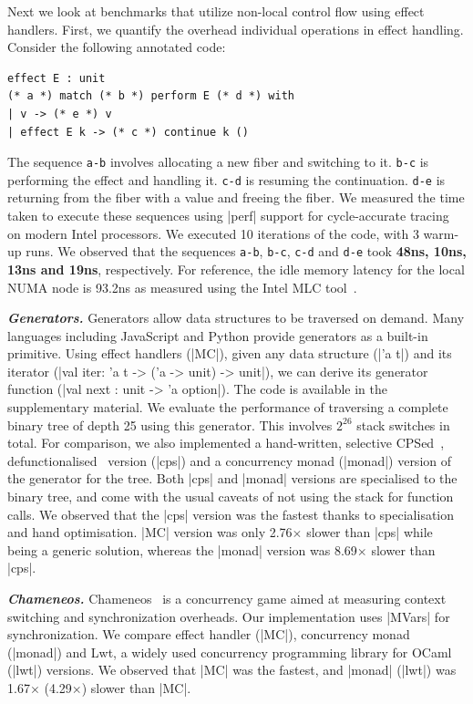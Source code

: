 \documentclass[sigplan,10pt,review,anonymous]{acmart}\settopmatter{printfolios=true,printccs=false,printacmref=false}
\begin{document}
Next we look at benchmarks that utilize non-local control flow using effect
handlers. First, we quantify the overhead individual operations in effect
handling. Consider the following annotated code:
\begin{lstlisting}
effect E : unit
(* a *) match (* b *) perform E (* d *) with
| v -> (* e *) v
| effect E k -> (* c *) continue k ()
\end{lstlisting}
The sequence \texttt{a-b} involves allocating a new fiber and switching to it.
\texttt{b-c} is performing the effect and handling it. \texttt{c-d} is resuming
the continuation. \texttt{d-e} is returning from the fiber with a value and
freeing the fiber. We measured the time taken to execute these sequences using
|perf| support for cycle-accurate tracing on modern Intel processors. We
executed 10 iterations of the code, with 3 warm-up runs. We observed that the
sequences \texttt{a-b}, \texttt{b-c}, \texttt{c-d} and \texttt{d-e} took
\textbf{48ns, 10ns, 13ns and 19ns}, respectively. For reference, the idle
memory latency for the local NUMA node is 93.2ns as measured using the Intel
MLC tool~\cite{mlc}.

\textbf{\textit{Generators.}} Generators allow data structures to be traversed on
demand. Many languages including JavaScript and Python provide generators as a
built-in primitive. Using effect handlers (|MC|), given any data structure
(|'a t|) and its iterator (|val iter: 'a t -> ('a -> unit) -> unit|), we can
derive its generator function (|val next : unit -> 'a option|). The code is
available in the supplementary material. We evaluate the performance of
traversing a complete binary tree of depth 25 using this generator. This
involves $2^{26}$ stack switches in total. For comparison, we also implemented
a hand-written, selective CPSed~\cite{Nielson01},
defunctionalised~\cite{Danvy01} version (|cps|) and a
concurrency monad (|monad|) version of the generator for the tree. Both |cps|
and |monad| versions are specialised to the binary tree, and come with the
usual caveats of not using the stack for function calls. We observed that the
|cps| version was the fastest thanks to specialisation and hand optimisation.
|MC| version was only 2.76$\times$ slower than |cps| while being a generic
solution, whereas the |monad| version was 8.69$\times$ slower than |cps|.

\textbf{\textit{Chameneos.}} Chameneos~\cite{Chameneos} is a concurrency game aimed at
measuring context switching and synchronization overheads. Our implementation
uses |MVars| for synchronization. We compare effect handler (|MC|), concurrency
monad (|monad|) and Lwt, a widely used concurrency programming library for
OCaml (|lwt|) versions. We observed that |MC| was the fastest, and |monad|
(|lwt|) was 1.67$\times$ (4.29$\times$) slower than |MC|.
\end{document}
